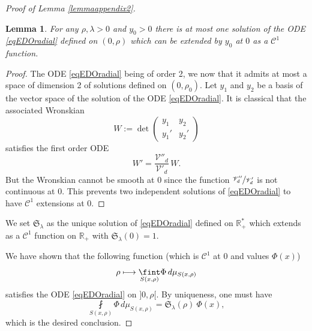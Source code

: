 \documentclass[10pt]{amsart}
\let\mathcal\mathscr
\def\mto{\mathchoice{\longmapsto}{\mapsto}{\mapsto}{\mapsto}}
\theoremstyle{plain}
\newtheorem{lemma}[equation]{Lemma}
\theoremstyle{definition}
\newcommand{\RR}{\mathbb{R}}
\newcommand{\finte}[3]{\underset{#1}{\fint} {#2} \, {#3}}
\begin{document}
\begin{proof}[Proof of Lemma \ref{lemmaappendix2}]
\begin{lemma}
\label{lemmeEDOradial}
For any $\rho, \lambda >0$ and $y_0 > 0$ there is at most one solution of the ODE \eqref{eqEDOradial} defined on $(0,\rho)$ which can be extended by $y_0$ at $0$ as a $\mathcal{C}^1$ function.
\end{lemma}

\begin{proof}
The ODE \eqref{eqEDOradial} being of order 2, we now that it admits at most a space of dimension 2 of solutions defined on $(0,\rho_0)$. Let $y_1$ and $y_2$ be a basis of the vector space of the solution of the ODE \eqref{eqEDOradial}. It is classical that the associated Wronskian
\[
W := \det \begin{pmatrix}
y_1 & y_2 \\ y_1' & y_2'
\end{pmatrix}
\]
satisfies the first order ODE
\[
W' = \frac{\mathcal{V}''_d}{\mathcal{V}'_d} \, W.
\]
But the Wronskian cannot be smooth at $0$ since the function $\sfrac{\mathcal{V}''_d}{\mathcal{V}'_d}$ is not continuous at $0$. This prevents two independent solutions of \eqref{eqEDOradial} to have $\mathcal{C}^1$ extensions at $0$.
\end{proof}

We set $\mathfrak{S}_{\lambda}$ as the unique solution of \eqref{eqEDOradial} defined on $\RR_+^*$ which extends as a $\mathcal{C}^1$ function on $\RR_+$ with $\mathfrak{S}_{\lambda}(0) =1$.

We have shown that the following function (which is $\mathcal{C}^1$ at $0$ and values $\Phi(x)$)
\[
\rho \mto \finte{S(x, \rho)}{\Phi}{ d \mu_{S(x,\rho)}}
\]
satisfies the ODE \eqref{eqEDOradial} on $]0,\rho[$. By uniqueness, one must have
\[
\finte{S(x, \rho)}{\Phi}{ d \mu_{S(x,\rho)}} = \mathfrak{S}_{\lambda}(\rho) \ \Phi(x),
\]
which is the desired conclusion.
\end{proof}
\end{document}

